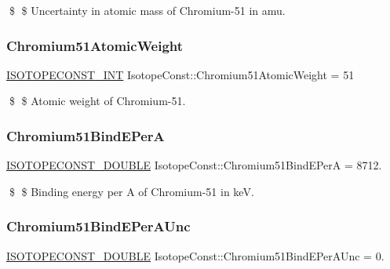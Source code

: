 \$ \$ Uncertainty in atomic mass of Chromium-\/51 in amu. \mbox{\label{group___isotope_const-_chromium-_cr51_ga252f84a5a47bc6136583dff8d284f39d}} 
\subsubsection{\texorpdfstring{Chromium51\+Atomic\+Weight}{Chromium51AtomicWeight}}
{\footnotesize\ttfamily \mbox{\hyperlink{group___isotope_const-_macros_ga5f18360b3e99483a35c32d789e62621c}{I\+S\+O\+T\+O\+P\+E\+C\+O\+N\+S\+T\+\_\+\+I\+NT}} Isotope\+Const\+::\+Chromium51\+Atomic\+Weight = 51}

\$ \$ Atomic weight of Chromium-\/51. \mbox{\label{group___isotope_const-_chromium-_cr51_ga65ef4dd2b8782c95b6bc7e6287cbb69f}} 
\subsubsection{\texorpdfstring{Chromium51\+Bind\+E\+PerA}{Chromium51BindEPerA}}
{\footnotesize\ttfamily \mbox{\hyperlink{group___isotope_const-_macros_ga8f45a7272ce02c0b4c65c44636ed719a}{I\+S\+O\+T\+O\+P\+E\+C\+O\+N\+S\+T\+\_\+\+D\+O\+U\+B\+LE}} Isotope\+Const\+::\+Chromium51\+Bind\+E\+PerA = 8712.}

\$ \$ Binding energy per A of Chromium-\/51 in keV. \mbox{\label{group___isotope_const-_chromium-_cr51_gaafffe734162fb837808705ea34a6c712}} 
\subsubsection{\texorpdfstring{Chromium51\+Bind\+E\+Per\+A\+Unc}{Chromium51BindEPerAUnc}}
{\footnotesize\ttfamily \mbox{\hyperlink{group___isotope_const-_macros_ga8f45a7272ce02c0b4c65c44636ed719a}{I\+S\+O\+T\+O\+P\+E\+C\+O\+N\+S\+T\+\_\+\+D\+O\+U\+B\+LE}} Isotope\+Const\+::\+Chromium51\+Bind\+E\+Per\+A\+Unc = 0.}

